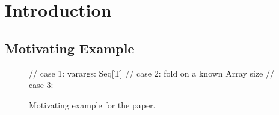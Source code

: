 
\section{Introduction}

\subsection{Motivating Example}

\begin{figure}
\begin{listing}
// case 1:
  varargs: Seq[T]
// case 2:
  fold on a known Array size
// case 3:

\end{listing}
\caption{\label{lst:vector_deep_ir} Motivating example for the paper.}
\end{figure}